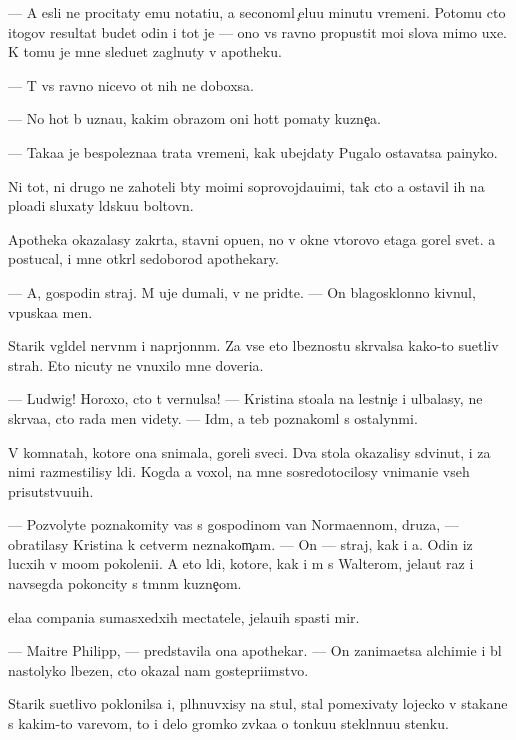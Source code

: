 \documentclass[10pt]{book}
\begin{document}
— A {\y}esli ne procitaty {\y}emu notati{\y}u, {\y}a seconoml{\io} {\c}elu{\y}u minutu vremeni. Potomu cto itogov{\yi}{\y} resultat budet odin i tot je — ono vs{\e} ravno propustit mo{\y}i slova mimo uxe{\y}. K tomu je mne sledu{\y}et zagl{\ia}nuty v apotheku.

— T{\yi} vs{\e} ravno nicevo ot nih ne dob{\y}oxsa.

— No hot{\ia} b{\yi} uzna{\y}u, kakim obrazom oni hot{\ia}t po{\y}maty kuzne{\c}a.

— Taka{\y}a je bespolezna{\y}a trata vremeni, kak ubejdaty Pugalo ostavatsa pa{\y}inyko{\y}.

Ni tot, ni drugo{\y} ne zahoteli b{\yi}ty mo{\y}imi soprovojda{\y}u{\x}imi, tak cto {\y}a ostavil ih na plo{\x}adi sluxaty l{\io}dsku{\y}u boltovn{\io}.

Apotheka okazalasy zakr{\yi}ta, stavni opu{\x}en{\yi}, no v okne vtorovo etaga gorel svet. {\Y}a postucal, i mne otkr{\yi}l sedoborod{\yi}{\y} apothekary.

— A, gospodin straj. M{\yi} uje dumali, v{\yi} ne prid{\e}te. — On blagosklonno kivnul, vpuska{\y}a men{\ia}.

Starik v{\yi}gl{\ia}del nervn{\yi}m i napr{\ia}jonn{\yi}m. Za vse{\y} eto{\y} l{\io}beznost{\y}u skr{\yi}valsa kako{\y}-to su{\y}etliv{\yi}{\y} strah. Eto nicuty ne vnuxilo mne doveri{\y}a.

— Ludwig! Horoxo, cto t{\yi} vernulsa! — Kristina sto{\y}ala na lestni{\c}e i ul{\yi}balasy, ne skr{\yi}va{\y}a, cto rada men{\ia} videty. — Id{\e}m, {\y}a teb{\ia} poznakoml{\io} s ostalyn{\yi}mi.

V komnatah, kotor{\yi}{\y}e ona snimala, goreli sveci. Dva stola okazalisy sdvinut{\yi}, i za nimi razmestilisy l{\io}di. Kogda {\y}a  voxol, na mne sosredotocilosy vnimani{\y}e vseh prisutstvu{\y}u{\x}ih.

— Pozvolyte poznakomity vas s gospodinom van Normaennom, druz{\y}a, — obratilasy Kristina k cetver{\yi}m neznakom{\c}am. — On — straj, kak i {\y}a. Odin iz lucxih v mo{\y}om pokoleni{\y}i. A eto l{\io}di, kotor{\yi}{\y}e, kak i m{\yi} s Walterom, jela{\y}ut raz i navsegda pokoncity s t{\e}mn{\yi}m kuzne{\c}om.

{\C}ela{\y}a compani{\y}a sumasxedxih mectatele{\y}, jela{\y}u{\x}ih spasti mir.

— Maitre Philipp, — predstavila ona apothekar{\ia}. — On zanima{\y}etsa alchimi{\y}e{\y} i b{\yi}l nastolyko l{\io}bezen, cto okazal nam gostepri{\y}imstvo.

Starik su{\y}etlivo poklonilsa i, pl{\io}hnuvxisy na stul, stal pomexivaty lojecko{\y} v stakane s kakim-to varevom, to i delo gromko zv{\ia}ka{\y}a o tonku{\y}u stekl{\ia}nnu{\y}u stenku.
\end{document}
